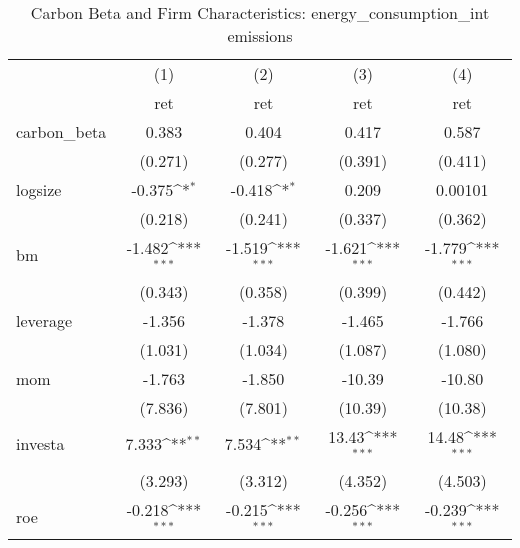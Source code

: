 \begin{table}[htbp]\centering
\def\sym#1{\ifmmode^{#1}\else\(^{#1}\)\fi}
\caption{Carbon Beta and Firm Characteristics: energy\_consumption\_int emissions}
\begin{tabular}{l*{4}{c}}
\hline\hline
                    &\multicolumn{1}{c}{(1)}&\multicolumn{1}{c}{(2)}&\multicolumn{1}{c}{(3)}&\multicolumn{1}{c}{(4)}\\
                    &\multicolumn{1}{c}{ret}&\multicolumn{1}{c}{ret}&\multicolumn{1}{c}{ret}&\multicolumn{1}{c}{ret}\\
\hline
carbon\_beta         &       0.383         &       0.404         &       0.417         &       0.587         \\
                    &     (0.271)         &     (0.277)         &     (0.391)         &     (0.411)         \\
[1em]
logsize             &      -0.375\sym{*}  &      -0.418\sym{*}  &       0.209         &     0.00101         \\
                    &     (0.218)         &     (0.241)         &     (0.337)         &     (0.362)         \\
[1em]
bm                  &      -1.482\sym{***}&      -1.519\sym{***}&      -1.621\sym{***}&      -1.779\sym{***}\\
                    &     (0.343)         &     (0.358)         &     (0.399)         &     (0.442)         \\
[1em]
leverage            &      -1.356         &      -1.378         &      -1.465         &      -1.766         \\
                    &     (1.031)         &     (1.034)         &     (1.087)         &     (1.080)         \\
[1em]
mom                 &      -1.763         &      -1.850         &      -10.39         &      -10.80         \\
                    &     (7.836)         &     (7.801)         &     (10.39)         &     (10.38)         \\
[1em]
investa             &       7.333\sym{**} &       7.534\sym{**} &       13.43\sym{***}&       14.48\sym{***}\\
                    &     (3.293)         &     (3.312)         &     (4.352)         &     (4.503)         \\
[1em]
roe                 &      -0.218\sym{***}&      -0.215\sym{***}&      -0.256\sym{***}&      -0.239\sym{***}\\

\end{tabular}
\end{table}
